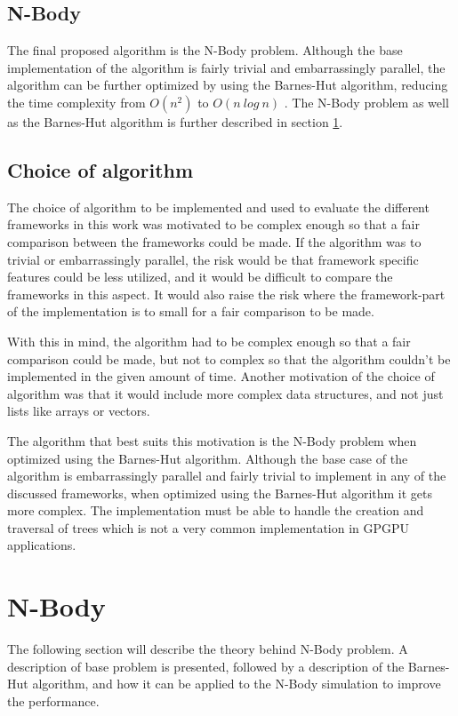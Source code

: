 \subsection{N-Body} \label{subsec:TheoryNBody}

The final proposed algorithm is the N-Body problem. Although the base implementation of the algorithm is fairly trivial and embarrassingly parallel, the algorithm can be further optimized by using the Barnes-Hut algorithm, reducing the time complexity from $O(n^2)$ to $O(n \ log \ n)$ \cite{barnes1986hierarchical}.  The N-Body problem as well as the Barnes-Hut algorithm is further described in section \ref{sec:NBodyTheory}.

\subsection{Choice of algorithm}

The choice of algorithm to be implemented and used to evaluate the different frameworks in this work was motivated to be complex enough so that a fair comparison between the frameworks could be made. If the algorithm was to trivial or embarrassingly parallel, the risk would be that framework specific features could be less utilized, and it would be difficult to compare the frameworks in this aspect. It would also raise the risk where the framework-part of the implementation is to small for a fair comparison to be made. 

With this in mind, the algorithm had to be complex enough so that a fair comparison could be made, but not to complex so that the algorithm couldn't be implemented in the given amount of time. Another motivation of the choice of algorithm was that it would include more complex data structures, and not just lists like arrays or vectors. 

The algorithm that best suits this motivation is the N-Body problem when optimized using the Barnes-Hut algorithm. Although the base case of the algorithm is embarrassingly parallel and fairly trivial to implement in any of the discussed frameworks, when optimized using the Barnes-Hut algorithm it gets more complex. The implementation must be able to handle the creation and traversal of trees which is not a very common implementation in GPGPU applications.

\section{N-Body} \label{sec:NBodyTheory}
The following section will describe the theory behind N-Body problem. A description of base problem is presented, followed by a description of the Barnes-Hut algorithm, and how it can be applied to the N-Body simulation to improve the performance.

